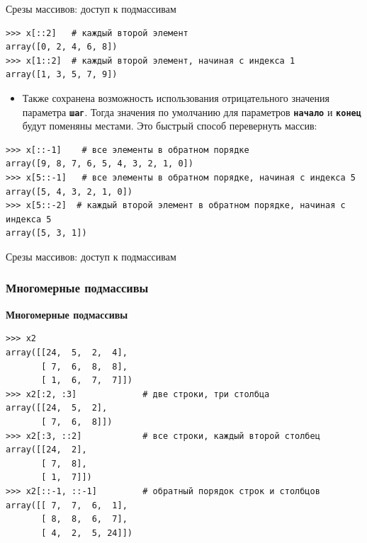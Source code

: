 \documentclass[aspectratio=169, mathserif]{beamer}	%
\begin{document}
\begin{frame}[fragile]{Срезы массивов: доступ к подмассивам}
\scriptsize
\begin{verbatim}
>>> x[::2]   # каждый второй элемент
array([0, 2, 4, 6, 8])
>>> x[1::2]  # каждый второй элемент, начиная с индекса 1 
array([1, 3, 5, 7, 9])
\end{verbatim}
\begin{itemize}
\item Также сохранена возможность использования отрицательного значения параметра \texttt{\textbf{шаг}}. Тогда значения по умолчанию для параметров \texttt{\textbf{начало}} и \texttt{\textbf{конец}} будут поменяны местами. Это быстрый способ перевернуть массив:
\end{itemize}

\begin{verbatim}
>>> x[::-1]    # все элементы в обратном порядке
array([9, 8, 7, 6, 5, 4, 3, 2, 1, 0])
>>> x[5::-1]   # все элементы в обратном порядке, начиная с индекса 5
array([5, 4, 3, 2, 1, 0])
>>> x[5::-2]  # каждый второй элемент в обратном порядке, начиная с индекса 5
array([5, 3, 1])
\end{verbatim}
\vfill
\end{frame}

\begin{frame}[fragile]{Срезы массивов: доступ к подмассивам}
\scriptsize
\subsubsection{Многомерные подмассивы}
\begin{alertblock}{\textbf{Многомерные подмассивы}}
\begin{verbatim}
>>> x2
array([[24,  5,  2,  4],
       [ 7,  6,  8,  8],
       [ 1,  6,  7,  7]])
>>> x2[:2, :3]             # две строки, три столбца
array([[24,  5,  2],
       [ 7,  6,  8]])
>>> x2[:3, ::2]            # все строки, каждый второй столбец
array([[24,  2],
       [ 7,  8],
       [ 1,  7]])
>>> x2[::-1, ::-1]         # обратный порядок строк и столбцов
array([[ 7,  7,  6,  1],
       [ 8,  8,  6,  7],
       [ 4,  2,  5, 24]])
\end{verbatim}
\end{alertblock}
\vfil
\end{frame}
\end{document}
